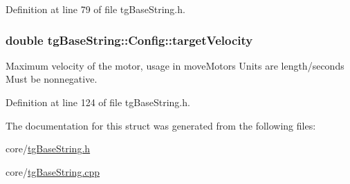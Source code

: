 Definition at line 79 of file tg\-Base\-String.\-h.

\hypertarget{structtg_base_string_1_1_config_aec33f58f8ed31fcc41efef395eeca779}{
\subsubsection[{target\-Velocity}]{\setlength{\rightskip}{0pt plus 5cm}double tg\-Base\-String\-::\-Config\-::target\-Velocity}}\label{structtg_base_string_1_1_config_aec33f58f8ed31fcc41efef395eeca779}
Maximum velocity of the motor, usage in move\-Motors Units are length/seconds Must be nonnegative. 

Definition at line 124 of file tg\-Base\-String.\-h.



The documentation for this struct was generated from the following files\-:\begin{DoxyCompactItemize}
\item 
core/\hyperlink{tg_base_string_8h}{tg\-Base\-String.\-h}\item 
core/\hyperlink{tg_base_string_8cpp}{tg\-Base\-String.\-cpp}\end{DoxyCompactItemize}
